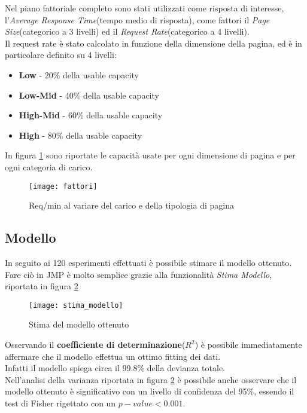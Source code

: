 Nel piano fattoriale completo sono stati utilizzati come risposta di interesse,
l'\textit{Average Response Time}(tempo medio di risposta), come fattori il
\textit{Page Size}(categorico a 3 livelli) ed il \textit{Request Rate}(categorico
 a 4 livelli).\\
Il request rate è stato calcolato in funzione della dimensione della pagina,
ed è in particolare definito su 4 livelli:
\begin{itemize}
  \item \textbf{Low} - 20\% della usable capacity
  \item \textbf{Low-Mid} - 40\% della usable capacity
  \item \textbf{High-Mid} - 60\% della usable capacity
  \item \textbf{High} - 80\% della usable capacity
\end{itemize}

In figura \ref{fattori} sono riportate le capacità usate per ogni dimensione di
pagina e per ogni categoria di carico.\\

\begin{figure}[!htbp]
  \centering
  \texttt{[image: fattori]}
  \caption{Req/min al variare del carico e della tipologia di pagina}
  \label{fattori}
\end{figure}

\clearpage

\subsection{Modello}
In seguito ai 120 esperimenti effettuati è possibile stimare il modello ottenuto.\\
Fare ciò in JMP è molto semplice grazie alla funzionalità \textit{Stima Modello},
riportata in figura \ref{stima_modello}

\begin{figure}[!htbp]
  \centering
  \texttt{[image: stima\_modello]}
  \caption{Stima del modello ottenuto}
  \label{stima_modello}
\end{figure}

Osservando il \textbf{coefficiente di determinazione}($R^{2}$) è possibile
immediatamente affermare che il modello effettua un ottimo fitting dei dati.\\
Infatti il modello spiega circa il 99.8\% della devianza totale.\\
Nell'analisi della varianza riportata in figura \ref{stima_modello} è possibile anche
osservare che il modello ottenuto è significativo con un livello di confidenza
del 95\%, essendo il test di Fisher rigettato con un $p-value<0.001$.\\

